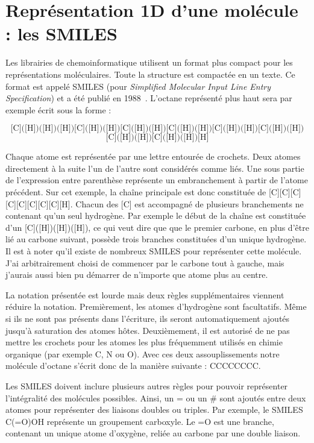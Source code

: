 \section{Représentation 1D d'une molécule : les SMILES}

Les librairies de chemoinformatique utilisent un format plus compact pour les représentations moléculaires.
Toute la structure est compactée en un texte.
Ce format est appelé SMILES (pour \textit{Simplified Molecular Input Line Entry Specification}) et a été publié en 1988~\cite{weininger_smiles_1988}.
L'octane représenté plus haut sera par exemple écrit sous la forme :

\[\text{[C]([H])([H])([H])[C]([H])([H])[C]([H])([H])[C]([H])([H])[C]([H])([H])[C]([H])([H])}\]
\[\text{[C]([H])([H])[C]([H])([H])[H]}\]

Chaque atome est représentée par une lettre entourée de crochets.
Deux atomes directement à la suite l'un de l'autre sont considérés comme liés.
Une sous partie de l'expression entre parenthèse représente un embranchement à partir de l'atome précédent.
Sur cet exemple, la chaîne principale est donc constituée de [C][C][C][C][C][C][C][C][H].
Chacun des [C] est accompagné de plusieurs branchements ne contenant qu'un seul hydrogène.
Par exemple le début de la chaîne est constituée d'un [C]([H])([H])([H]), ce qui veut dire que que le premier carbone, en plus d'être lié au carbone suivant, possède trois branches constituées d'un unique hydrogène.
Il est à noter qu'il existe de nombreux SMILES pour représenter cette molécule.
J'ai arbitrairement choisi de commencer par le carbone tout à gauche, mais j'aurais aussi bien pu démarrer de n'importe que atome plus au centre.

La notation présentée est lourde mais deux règles supplémentaires viennent réduire la notation.
Premièrement, les atomes d'hydrogène sont facultatifs.
Même si ils ne sont pas présents dans l'écriture, ils seront automatiquement ajoutés jusqu'à saturation des atomes hôtes.
Deuxièmement, il est autorisé de ne pas mettre les crochets pour les atomes les plus fréquemment utilisés en chimie organique (par exemple C, N ou O).
Avec ces deux assouplissements notre molécule d'octane s'écrit donc de la manière suivante : CCCCCCCC.

Les SMILES doivent inclure plusieurs autres règles pour pouvoir représenter l'intégralité des molécules possibles.
Ainsi, un = ou un \# sont ajoutés entre deux atomes pour représenter des liaisons doubles ou triples.
Par exemple, le SMILES C(=O)OH représente un groupement carboxyle.
Le =O est une branche, contenant un unique atome d'oxygène, reliée au carbone par une double liaison.

